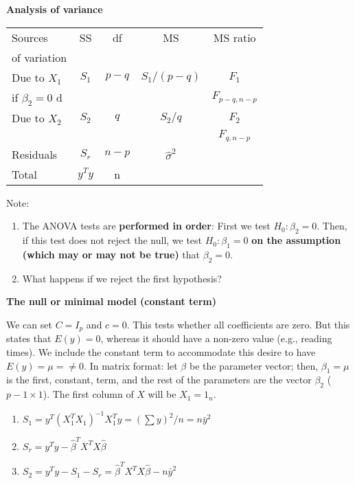 \textbf{Analysis of variance}

\begin{tabular}{|l|c|c|c|c|}
\hline
Sources & SS & df & MS & MS ratio\\
 of variation & & & & \\
\hline
Due to $X_1$  & $S_1$ & $p-q$ & $S_1/(p-q)$ & $F_1$ \\
if $\beta_2=0$   d& & & & $F_{p-q,n-p}$\\
\hline
Due to $X_2$ & $S_2$ & $q$ & $S_2/q$ & $F_2$\\
& & & &  $F_{q,n-p}$\\
\hline
Residuals   & $S_r$ & $n-p$ & $\hat{\sigma}^2$ & \\
\hline
Total           & $y^T y$  & n &  &\\
\hline
\end{tabular}

Note:

\begin{enumerate}
\item 
The ANOVA tests are \textbf{performed in order}:  First we test $H_0: \beta_2=0$. Then, if this test does not reject the null, we test $H_0: \beta_1 = 0$ \textbf{on the assumption (which may or may not be true)} that $\beta_2=0$. 
\item What happens if we reject the first hypothesis?
\end{enumerate}

\textbf{The null or minimal model (constant term)}

We can set $C=I_p$ and $c=0$. This tests whether all coefficients are zero. But this states that $E(y)=0$, whereas it should have a non-zero value (e.g., reading times).  We include the constant term to accommodate this desire to have $E(y)=\mu=\neq 0$. In matrix format: let $\beta$ be the parameter vector; then, $\beta_1=\mu$ is the first, constant, term, and the rest of the parameters are the vector $\beta_2$ ($p-1\times 1$).
The first column of $X$ will be $X_1=1_n$.

\begin{enumerate}
\item
$S_1=y^T (X_1^T X_1)^{-1} X_1^T y = (\sum y)^2/n = n\bar{y}^2$
\item
$S_r = y^Ty - \hat{\beta}^T X^T X\hat{\beta}$
\item
$S_2 = y^T y -S_1 - S_r = \hat{\beta}^T X^T X\hat{\beta}-n\bar{y}^2$
\end{enumerate}

